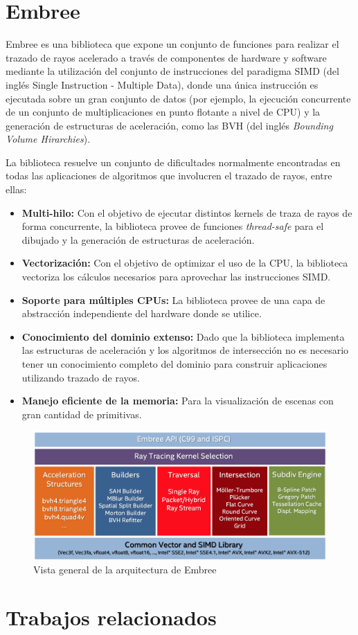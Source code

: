 \section{Embree}
Embree es una biblioteca que expone un conjunto de funciones para realizar el trazado de rayos acelerado a través de componentes de hardware y software mediante la utilización del conjunto de instrucciones del paradigma SIMD (del inglés Single Instruction - Multiple Data), donde una única instrucción es ejecutada sobre un gran conjunto de datos (por ejemplo, la ejecución concurrente de un conjunto de multiplicaciones en punto flotante a nivel de CPU) y la generación de estructuras de aceleración, como las BVH (del inglés \textit{Bounding Volume Hirarchies}).

La biblioteca resuelve un conjunto de dificultades normalmente encontradas en todas las aplicaciones de algoritmos que involucren el trazado de rayos, entre ellas:

\begin{itemize}
	\item \textbf{Multi-hilo:} Con el objetivo de ejecutar distintos kernels de traza de rayos de forma concurrente, la biblioteca provee de funciones \textit{thread-safe} para el dibujado y la generación de estructuras de aceleración.
	\item \textbf{Vectorización:} Con el objetivo de optimizar el uso de la CPU, la biblioteca vectoriza los cálculos necesarios para aprovechar las instrucciones SIMD.
	\item \textbf{Soporte para múltiples CPUs:} La biblioteca provee de una capa de abstracción independiente del hardware donde se utilice.
	\item \textbf{Conocimiento del dominio extenso:} Dado que la biblioteca implementa las estructuras de aceleración y los algoritmos de intersección no es necesario tener un conocimiento completo del dominio para construir aplicaciones utilizando trazado de rayos.
	\item \textbf{Manejo eficiente de la memoria:} Para la visualización de escenas con gran cantidad de primitivas.
\end{itemize} 

\vspace{5mm}
\begin{figure}[H]
	\centering
	\includegraphics[width=.8\linewidth]{assets/embree}
	\caption{Vista general de la arquitectura de Embree}
	\label{img:embree}
\end{figure}

\section{Trabajos relacionados}